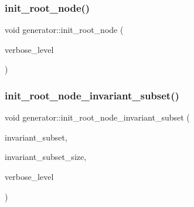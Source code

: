 \subsubsection{\texorpdfstring{init\+\_\+root\+\_\+node()}{init\_root\_node()}}
{\footnotesize\ttfamily void generator\+::init\+\_\+root\+\_\+node (\begin{DoxyParamCaption}\item[{\mbox{\hyperlink{galois_8h_a09fddde158a3a20bd2dcadb609de11dc}{I\+NT}}}]{verbose\+\_\+level }\end{DoxyParamCaption})}

\mbox{\label{classgenerator_a9baef67b558d70f55a086b6b5c53c430}} 
\subsubsection{\texorpdfstring{init\+\_\+root\+\_\+node\+\_\+invariant\+\_\+subset()}{init\_root\_node\_invariant\_subset()}}
{\footnotesize\ttfamily void generator\+::init\+\_\+root\+\_\+node\+\_\+invariant\+\_\+subset (\begin{DoxyParamCaption}\item[{\mbox{\hyperlink{galois_8h_a09fddde158a3a20bd2dcadb609de11dc}{I\+NT}} $\ast$}]{invariant\+\_\+subset,  }\item[{\mbox{\hyperlink{galois_8h_a09fddde158a3a20bd2dcadb609de11dc}{I\+NT}}}]{invariant\+\_\+subset\+\_\+size,  }\item[{\mbox{\hyperlink{galois_8h_a09fddde158a3a20bd2dcadb609de11dc}{I\+NT}}}]{verbose\+\_\+level }\end{DoxyParamCaption})}

\mbox{\label{classgenerator_aa9e98a926039f985a787c8e2052c632c}} 
